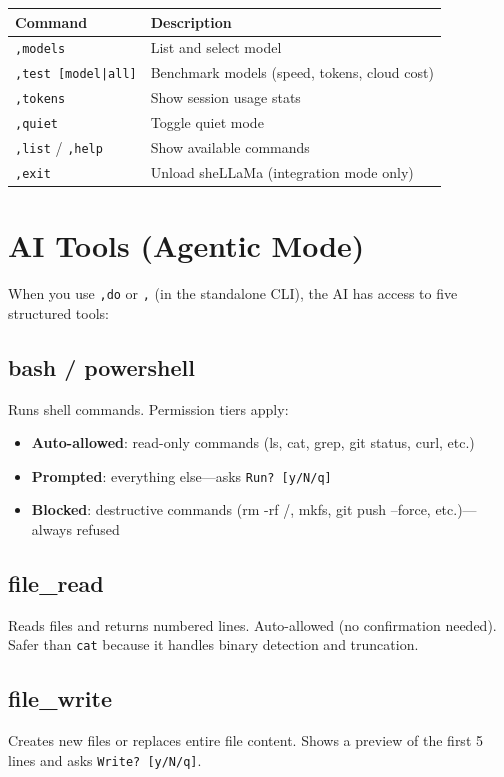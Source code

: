 \documentclass[11pt,a4paper]{article}
\begin{document}
\begin{longtable}{p{5cm}p{8.5cm}}
\toprule
\textbf{Command} & \textbf{Description} \\
\midrule
\texttt{,models} & List and select model \\
\texttt{,test [model|all]} & Benchmark models (speed, tokens, cloud cost) \\
\texttt{,tokens} & Show session usage stats \\
\texttt{,quiet} & Toggle quiet mode \\
\texttt{,list} / \texttt{,help} & Show available commands \\
\texttt{,exit} & Unload sheLLaMa (integration mode only) \\
\bottomrule
\end{longtable}

\section{AI Tools (Agentic Mode)}

When you use \texttt{,do} or \texttt{,} (in the standalone CLI), the AI has access to five structured tools:

\subsection{bash / powershell}
Runs shell commands. Permission tiers apply:
\begin{itemize}
  \item \textbf{Auto-allowed}: read-only commands (ls, cat, grep, git status, curl, etc.)
  \item \textbf{Prompted}: everything else---asks \texttt{Run? [y/N/q]}
  \item \textbf{Blocked}: destructive commands (rm -rf /, mkfs, git push --force, etc.)---always refused
\end{itemize}

\subsection{file\_read}
Reads files and returns numbered lines. Auto-allowed (no confirmation needed). Safer than \texttt{cat} because it handles binary detection and truncation.

\subsection{file\_write}
Creates new files or replaces entire file content. Shows a preview of the first 5 lines and asks \texttt{Write? [y/N/q]}.
\end{document}
